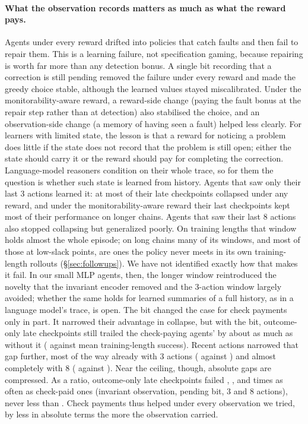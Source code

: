 \paragraph{What the observation records matters as much as what the reward pays.}
Agents under every reward drifted into policies that catch faults and then fail to repair them. This is a learning failure, not specification gaming, because repairing is worth far more than any detection bonus. A single bit recording that a correction is still pending removed the failure under every reward and made the greedy choice stable, although the learned values stayed miscalibrated. Under the monitorability-aware reward, a reward-side change (paying the fault bonus at the repair step rather than at detection) also stabilised the choice, and an observation-side change (a memory of having seen a fault) helped less clearly. For learners with limited state, the lesson is that a reward for noticing a problem does little if the state does not record that the problem is still open; either the state should carry it or the reward should pay for completing the correction. Language-model reasoners condition on their whole trace, so for them the question is whether such state is learned from history. Agents that saw only their last 3 actions learned it: at most  of their late checkpoints collapsed under any reward, and under the monitorability-aware reward their last checkpoints kept most of their performance on longer chains. Agents that saw their last 8 actions also stopped collapsing but generalized poorly. On training lengths that window holds almost the whole episode; on long chains many of its windows, and most of those at low-slack points, are ones the policy never meets in its own training-length rollouts (\S\ref{sec:followups}). We have not identified exactly how that makes it fail. In our small MLP agents, then, the longer window reintroduced the novelty that the invariant encoder removed and the 3-action window largely avoided; whether the same holds for learned summaries of a full history, as in a language model's trace, is open. The bit changed the case for check payments only in part. It narrowed their advantage in collapse, but with the bit, outcome-only late checkpoints still trailed the check-paying agents' by about as much as without it ( against  mean training-length success). Recent actions narrowed that gap further, most of the way already with 3 actions ( against ) and almost completely with 8 ( against ). Near the ceiling, though, absolute gaps are compressed. As a ratio, outcome-only late checkpoints failed , ,  and  times as often as check-paid ones (invariant observation, pending bit, 3 and 8 actions), never less than . Check payments thus helped under every observation we tried, by less in absolute terms the more the observation carried.

